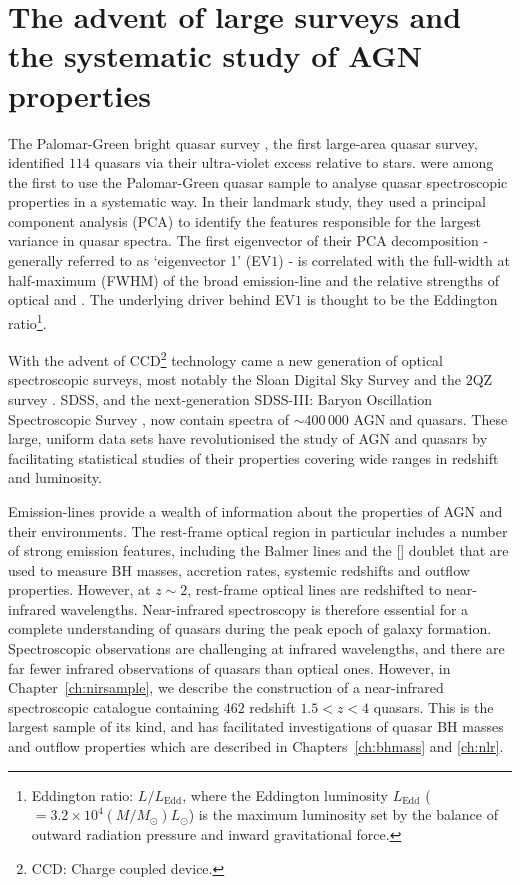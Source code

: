 \section[Large quasar surveys]{The advent of large surveys and the systematic study of AGN properties}

The Palomar-Green bright quasar survey \citep{schmidt83}, the first large-area quasar survey, identified $114$ quasars via their ultra-violet excess relative to stars. 
\citet{boroson92} were among the first to use the Palomar-Green quasar sample to analyse quasar spectroscopic properties in a systematic way. 
In their landmark study, they used a principal component analysis (PCA) to identify the features responsible for the largest variance in quasar spectra. 
The first eigenvector of their PCA decomposition - generally referred to as `eigenvector 1' (EV$1$) - is correlated with the full-width at half-maximum (FWHM) of the broad \hb emission-line and the relative strengths of optical  and \hbns. 
The underlying driver behind EV$1$ is thought to be the Eddington ratio\footnote{Eddington ratio: $L/L_{\text{Edd}}$, where the Eddington luminosity $L_{\text{Edd}}$ ($=3.2\times10^4(M/M_\odot)L_\odot$) is the maximum luminosity set by the balance of outward radiation pressure and inward gravitational force.}. 

With the advent of CCD\footnote{CCD: Charge coupled device.} technology came a new generation of optical spectroscopic surveys, most notably the Sloan Digital Sky Survey \citep[SDSS;][]{york00} and the $2$QZ survey \citep{croom04}. 
SDSS, and the next-generation SDSS-III: Baryon Oscillation Spectroscopic Survey \citep[BOSS;][]{dawson13}, now contain spectra of $\sim400\,000$ AGN and quasars. 
These large, uniform data sets have revolutionised the study of AGN and quasars by facilitating statistical studies of their properties covering wide ranges in redshift and luminosity.

Emission-lines provide a wealth of information about the properties of AGN and their environments. 
The rest-frame optical region in particular includes a number of strong emission features, including the Balmer lines and the [] doublet that are used to measure BH masses, accretion rates, systemic redshifts and outflow properties. 
However, at $z\sim2$, rest-frame optical lines are redshifted to near-infrared wavelengths. 
Near-infrared spectroscopy is therefore essential for a complete understanding of quasars during the peak epoch of galaxy formation. 
Spectroscopic observations are challenging at infrared wavelengths, and there are far fewer infrared observations of quasars than optical ones. 
However, in Chapter~\ref{ch:nirsample}, we describe the construction of a near-infrared spectroscopic catalogue containing $462$ redshift $1.5 < z < 4$ quasars. 
This is the largest sample of its kind, and has facilitated investigations of quasar BH masses and outflow properties which are described in Chapters~\ref{ch:bhmass} and \ref{ch:nlr}.   


